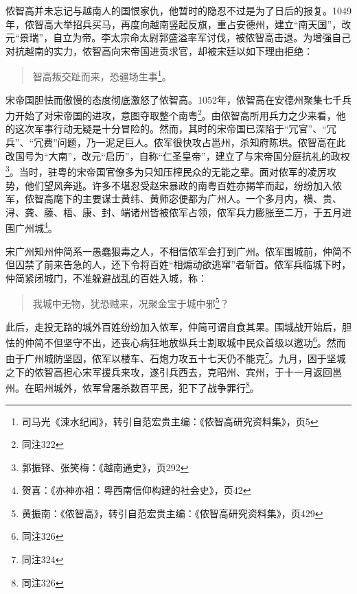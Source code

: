 侬智高并未忘记与越南人的国恨家仇，他暂时的隐忍不过是为了日后的报复。1049年，侬智高大举招兵买马，再度向越南竖起反旗，重占安德州，建立“南天国”，改元“景瑞”，自立为帝。李太宗命太尉郭盛溢率军讨伐，被侬智高击退。为增强自己对抗越南的实力，侬智高向宋帝国进贡求官，却被宋廷以如下理由拒绝：

\begin{quote}
智高叛交趾而来，恐疆场生事\footnote{司马光《涑水纪闻》，转引自范宏贵主编：《侬智高研究资料集》，页5}。
\end{quote}

宋帝国胆怯而傲慢的态度彻底激怒了侬智高。1052年，侬智高在安德州聚集七千兵力开始了对宋帝国的进攻，意图夺取整个南粤\footnote{同注322}。由侬智高所用兵力之少来看，他的这次军事行动无疑是十分冒险的。然而，其时的宋帝国已深陷于“冗官”、“冗兵”、“冗费”问题，乃一泥足巨人。侬军很快攻占邕州，杀知府陈珙。侬智高在此改国号为“大南”，改元“启历”，自称“仁圣皇帝”，建立了与宋帝国分庭抗礼的政权\footnote{郭振铎、张笑梅：《越南通史》，页292}。当时，驻粤的宋帝国官僚多为只知压榨民众的无能之辈。面对侬军的凌厉攻势，他们望风奔逃。许多不堪忍受赵宋暴政的南粤百姓亦揭竿而起，纷纷加入侬军，侬智高麾下的主要谋士黄纬、黄师宓便都为广州人。一个多月内，横、贵、浔、龚、藤、梧、康、封、端诸州皆被侬军占领，侬军兵力膨胀至二万，于五月进围广州城\footnote{贺喜：《亦神亦祖：粤西南信仰构建的社会史》，页42}。

宋广州知州仲简系一愚蠢狠毒之人，不相信侬军会打到广州。侬军围城前，仲简不但囚禁了前来告急的人，还下令将百姓“相煽动欲逃窜”者斩首。侬军兵临城下时，仲简紧闭城门，不准躲避战乱的百姓入城，称：


\begin{quote}

我城中无物，犹恐贼来，况聚金宝于城中邪\footnote{黄振南：《侬智高》，转引自范宏贵主编：《侬智高研究资料集》，页429}？
\end{quote}

此后，走投无路的城外百姓纷纷加入侬军，仲简可谓自食其果。围城战开始后，胆怯的仲简不但坚守不出，还丧心病狂地放纵兵士割取城中民众首级以邀功\footnote{同注326}。然而由于广州城防坚固，侬军以楼车、石炮力攻五十七天仍不能克\footnote{同注324}。九月，困于坚城之下的侬智高担心宋军援兵来攻，遂引兵西去，克昭州、宾州，于十一月返回邕州。在昭州城外，侬军曾屠杀数百平民，犯下了战争罪行\footnote{同注326}。

